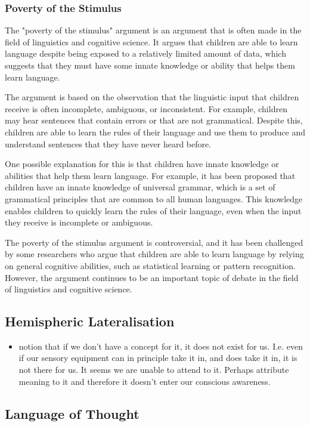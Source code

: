 \subsubsection{Poverty of the Stimulus}
The "poverty of the stimulus" argument is an argument that is often made in the field of linguistics and cognitive science. It argues that children are able to learn language despite being exposed to a relatively limited amount of data, which suggests that they must have some innate knowledge or ability that helps them learn language.

The argument is based on the observation that the linguistic input that children receive is often incomplete, ambiguous, or inconsistent. For example, children may hear sentences that contain errors or that are not grammatical. Despite this, children are able to learn the rules of their language and use them to produce and understand sentences that they have never heard before.

One possible explanation for this is that children have innate knowledge or abilities that help them learn language. For example, it has been proposed that children have an innate knowledge of universal grammar, which is a set of grammatical principles that are common to all human languages. This knowledge enables children to quickly learn the rules of their language, even when the input they receive is incomplete or ambiguous.

The poverty of the stimulus argument is controversial, and it has been challenged by some researchers who argue that children are able to learn language by relying on general cognitive abilities, such as statistical learning or pattern recognition. However, the argument continues to be an important topic of debate in the field of linguistics and cognitive science.

\subsection{Hemispheric Lateralisation}
\begin{itemize}
    \item notion that if we don't have a concept for it, it does not exist for us. I.e. even if our sensory equipment can in principle take it in, and does take it in, it is not there for us. It seems we are unable to attend to it. Perhaps attribute meaning to it and therefore it doesn't enter our conscious awareness.
\end{itemize}

\subsection{Language of Thought}

